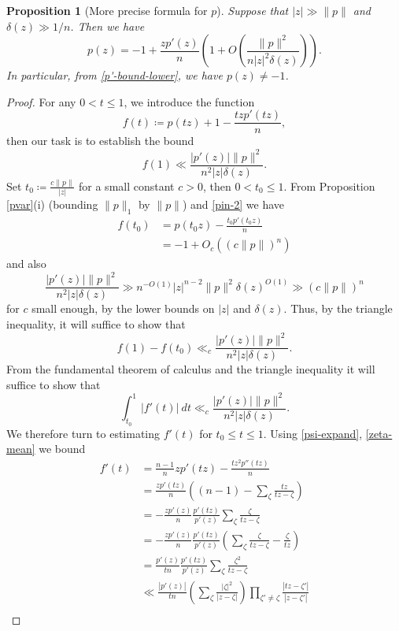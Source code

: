 \documentclass[12pt]{amsart}
\newtheorem{proposition}[theorem]{Proposition}
\begin{document}
\begin{proposition}[More precise formula for $p$]\label{pform}  Suppose that $|z| \gg \|p\|$ and $\delta(z) \gg 1/n$.  Then we have
    $$ p(z) = -1 + \frac{zp'(z)}{n} \left( 1 + O\left(\frac{\|p\|^2}{n |z|^2 \delta(z)} \right) \right).$$
    In particular, from \eqref{p'-bound-lower}, we have $p(z) \neq -1$.
\end{proposition}

\begin{proof}  For any $0 < t \leq 1$, we introduce the function
    $$ f(t) \coloneqq p(tz) + 1 - \frac{tzp'(tz)}{n},$$
then our task is to establish the bound
$$ f(1) \ll \frac{|p'(z)| \|p\|^2}{n^2 |z| \delta(z)}.$$
Set $t_0 \coloneqq \frac{c\|p\|}{|z|}$ for a small constant $c>0$, then $0 < t_0 \leq 1$.
From Proposition \ref{pvar}(i) (bounding $\|p\|_1$ by $\|p\|$) and \eqref{pin-2} we have
\begin{equation}\label{1eps}
 \begin{split}
    f(t_0) &= p(t_0 z) - \frac{t_0 p'(t_0 z)}{n} \\
    &= -1 + O_c\left( (c\|p\|)^n \right)
 \end{split}
\end{equation}
and also
$$
\frac{|p'(z)| \|p\|^2}{n^2 |z| \delta(z)} \gg n^{-O(1)} |z|^{n-2} \|p\|^2 \delta(z)^{O(1)} \gg (c\|p\|)^n
$$
for $c$ small enough, by the lower bounds on $|z|$ and $\delta(z)$.  Thus, by the triangle inequality, it will suffice to show that
$$ f(1) - f(t_0) \ll_c \frac{|p'(z)| \|p\|^2}{n^2 |z| \delta(z)}.$$
From the fundamental theorem of calculus and the triangle inequality it will suffice to show that
$$ \int_{t_0}^1 |f'(t)|\ dt \ll_c \frac{|p'(z)| \|p\|^2}{n^2 |z| \delta(z)}.$$
We therefore turn to estimating $f'(t)$ for $t_0 \leq t \leq 1$.  Using \eqref{psi-expand}, \eqref{zeta-mean} we bound
\begin{align*}
 f'(t)
&= \frac{n-1}{n} zp'(tz) - \frac{tz^2 p''(tz)}{n} \\
&= \frac{zp'(tz)}{n} \left( (n-1) - \sum_\zeta \frac{tz}{tz-\zeta} \right) \\
&= - \frac{zp'(z)}{n} \frac{p'(tz)}{p'(z)} \sum_\zeta \frac{\zeta}{tz-\zeta} \\
&= - \frac{zp'(z)}{n} \frac{p'(tz)}{p'(z)} \left( \sum_\zeta \frac{\zeta}{tz-\zeta} - \frac{\zeta}{tz} \right) \\
&= \frac{p'(z)}{tn} \frac{p'(tz)}{p'(z)} \sum_\zeta \frac{\zeta^2}{tz-\zeta} \\
&\ll \frac{|p'(z)|}{tn} \left( \sum_\zeta \frac{|\zeta|^2}{|z-\zeta|} \right) \prod_{\zeta' \neq \zeta} \frac{|tz-\zeta'|}{|z-\zeta'|} \\

\end{align*}
\end{proof}
\end{document}
